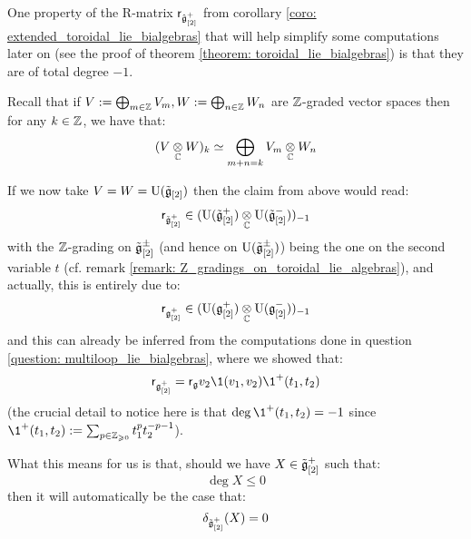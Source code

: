         \begin{remark} \label{remark: total_degrees_of_classical_yangian_R_matrices}
            One property of the R-matrix $\mathsf{r}_{\hat{\mathfrak{g}}_{[2]}^+}$ from corollary \ref{coro: extended_toroidal_lie_bialgebras} that will help simplify some computations later on (see the proof of theorem \ref{theorem: toroidal_lie_bialgebras}) is that they are of total degree $-1$. 

            Recall that if $V := \bigoplus_{m \in \mathbb{Z}} V_m, W := \bigoplus_{n \in \mathbb{Z}} W_n$ are $\mathbb{Z}$-graded vector spaces then for any $k \in \mathbb{Z}$, we have that:
                $$(V \tensor_{\bbC} W)_k \cong \bigoplus_{m + n = k} V_m \tensor_{\bbC} W_n$$
                
            If we now take $V = W = \mathrm{U}(\tilde{\mathfrak{g}}_{[2]})$ then the claim from above would read:
                $$\sfr_{\tilde{\g}_{[2]}^+} \in ( \rmU(\tilde{\g}_{[2]}^+) \tensor_{\bbC} \rmU(\tilde{\g}_{[2]}^-) )_{-1}$$
            with the $\mathbb{Z}$-grading on $\tilde{\mathfrak{g}}_{[2]}^{\pm}$ (and hence on $\mathrm{U}(\tilde{\mathfrak{g}}_{[2]}^{\pm})$) being the one on the second variable $t$ (cf. remark \ref{remark: Z_gradings_on_toroidal_lie_algebras}), and actually, this is entirely due to:
                $$\sfr_{\g_{[2]}^+} \in ( \rmU(\g_{[2]}^+) \tensor_{\bbC} \rmU(\g_{[2]}^-) )_{-1}$$
            and this can already be inferred from the computations done in question \ref{question: multiloop_lie_bialgebras}, where we showed that:
                $$\sfr_{\g_{[2]}^+} = \sfr_{\g} v_2 \1(v_1, v_2) \1^+(t_1, t_2)$$
            (the crucial detail to notice here is that $\deg \1^+(t_1, t_2) = -1$ since $\1^+(t_1, t_2) := \sum_{p \in \Z_{\geq 0}} t_1^p t_2^{-p - 1}$).

            What this means for us is that, should we have $X \in \tilde{\mathfrak{g}}_{[2]}^+$ such that:
                $$\deg X \leq 0$$
            then it will automatically be the case that:
                $$\delta_{\tilde{\mathfrak{g}}_{[2]}^+}(X) = 0$$
        \end{remark}
        
